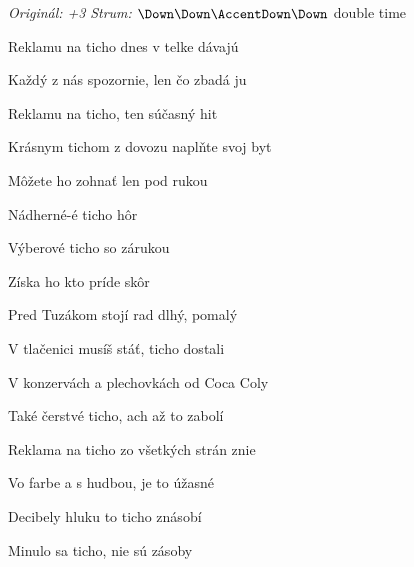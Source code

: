 \begin{song}


\begin{headerbox}
\RaiseBoxWithAccents
{} \quad
\textit{Originál: +3} \quad
\textit{Strum:} $\Down\Down\AccentDown\Down$ double time
\end{headerbox}

\begin{vchordbox}
\end{vchordbox}

\Large

\bigskip

Reklamu na ticho dnes v telke dávajú \par
{}Každý z nás spozornie, len čo zbadá ju \par
{}Reklamu na ticho, ten súčasný hit \par
{}Krásnym tichom z dovozu naplňte svoj byt \par

\bigskip

\begin{chorusbox}{\Refren}
Môžete ho zohnať len pod rukou \par
{}Nádherné-é ticho hôr \par
{}Výberové ticho  so zárukou \par
{}Získa ho kto príde skôr    \par
\end{chorusbox}

\bigskip

Pred Tuzákom stojí rad dlhý, pomalý \par
{}V tlačenici musíš stáť, ticho dostali \par
{}V konzervách a plechovkách od Coca Coly \par
{}Také čerstvé ticho, ach až to zabolí \par

\bigskip

\Refren

\bigskip

Reklama na ticho zo všetkých strán znie \par
{}Vo farbe a s hudbou, je to úžasné \par
{}Decibely hluku to ticho znásobí \par
{}Minulo sa ticho, nie sú zásoby \par


\end{song}
